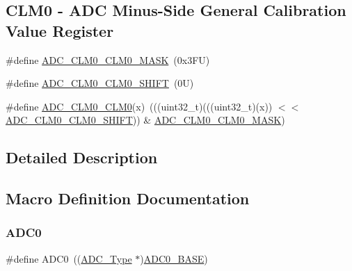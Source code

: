 \subsection*{C\+L\+M0 -\/ A\+DC Minus-\/\+Side General Calibration Value Register}
\begin{DoxyCompactItemize}
\item 
\#define \mbox{\hyperlink{group___a_d_c___register___masks_ga2f9f36fb3b4eceab2198582865dc5b14}{A\+D\+C\+\_\+\+C\+L\+M0\+\_\+\+C\+L\+M0\+\_\+\+M\+A\+SK}}~(0x3\+F\+U)
\item 
\#define \mbox{\hyperlink{group___a_d_c___register___masks_gaf5a5fd710a47f83c5ee3fd083f430a66}{A\+D\+C\+\_\+\+C\+L\+M0\+\_\+\+C\+L\+M0\+\_\+\+S\+H\+I\+FT}}~(0\+U)
\item 
\#define \mbox{\hyperlink{group___a_d_c___register___masks_ga388deb317a8fa21fa77fc0d5df262966}{A\+D\+C\+\_\+\+C\+L\+M0\+\_\+\+C\+L\+M0}}(x)~(((uint32\+\_\+t)(((uint32\+\_\+t)(x)) $<$$<$ \mbox{\hyperlink{group___a_d_c___register___masks_gaf5a5fd710a47f83c5ee3fd083f430a66}{A\+D\+C\+\_\+\+C\+L\+M0\+\_\+\+C\+L\+M0\+\_\+\+S\+H\+I\+FT}})) \& \mbox{\hyperlink{group___a_d_c___register___masks_ga2f9f36fb3b4eceab2198582865dc5b14}{A\+D\+C\+\_\+\+C\+L\+M0\+\_\+\+C\+L\+M0\+\_\+\+M\+A\+SK}})
\end{DoxyCompactItemize}


\subsection{Detailed Description}


\subsection{Macro Definition Documentation}
\mbox{\label{group___a_d_c___register___masks_ga0d2ea0f4a8dd17bf08e69d05deacbcb5}} 
\subsubsection{\texorpdfstring{A\+D\+C0}{ADC0}}
{\footnotesize\ttfamily \#define A\+D\+C0~((\mbox{\hyperlink{struct_a_d_c___type}{A\+D\+C\+\_\+\+Type}} $\ast$)\mbox{\hyperlink{group___a_d_c___register___masks_ga0aa6c0c068af7a61c770bc6d4322d63e}{A\+D\+C0\+\_\+\+B\+A\+SE}})}

